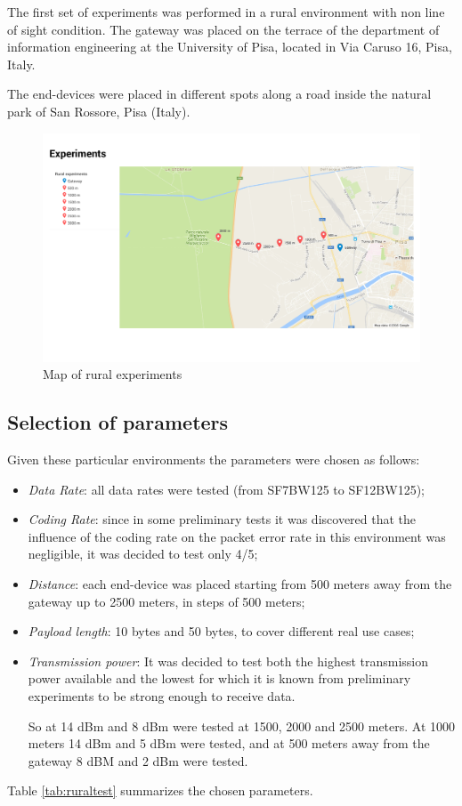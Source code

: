 The first set of experiments was performed in a rural environment with non line of sight condition. The gateway was placed on the terrace of the department of information engineering at the University of Pisa, located in Via Caruso 16, Pisa, Italy.

The end-devices were placed in different spots along a road inside the natural park of San Rossore, Pisa (Italy).

\begin{figure}[]
\centering
\includegraphics[width=\textwidth]{img/map_rural}
\caption{Map of rural experiments}
\label{fig:maprural}
\end{figure}


\subsection{Selection of parameters} 
Given these particular environments the parameters were chosen as follows:
\begin{itemize}
\item \emph{Data Rate}: all data rates were tested (from SF7BW125 to SF12BW125);
\item \emph{Coding Rate}: since in some preliminary tests it was discovered that the influence of the coding rate on the packet error rate in this environment was negligible, it was decided to test only 4/5;
\item \emph{Distance}: each end-device was placed starting from 500 meters away from the gateway up to 2500 meters, in steps of 500 meters;
\item \emph{Payload length}: 10 bytes and 50 bytes, to cover different real use cases;
\item \emph{Transmission power}: It was decided to test both the highest transmission power available and the lowest for which it is known from preliminary experiments to be strong enough to receive data.

So at 14 dBm and 8 dBm were tested at 1500, 2000 and 2500 meters. At 1000 meters 14 dBm and 5 dBm were tested, and at 500 meters away from the gateway 8 dBM and 2 dBm were tested.
\end{itemize}
Table \ref{tab:ruraltest} summarizes the chosen parameters.


